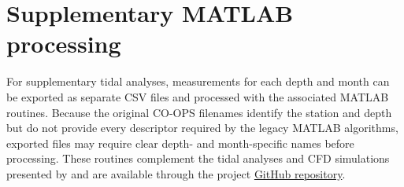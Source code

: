 \documentclass[12pt,sort&compress]{elsarticle}
\begin{document}
\section{Supplementary MATLAB processing}
\label{app:matlab}

For supplementary tidal analyses, measurements for each depth and month can be exported as separate CSV files and processed with the associated MATLAB routines. Because the original CO-OPS filenames identify the station and depth but do not provide every descriptor required by the legacy MATLAB algorithms, exported files may require clear depth- and month-specific names before processing. These routines complement the tidal analyses and CFD simulations presented by \citet{husoVP2026} and are available through the project \href{https://github.com/hosseinsz93/Verdant-SBU-tidal-project}{GitHub repository}.

{\small


}
\end{document}
